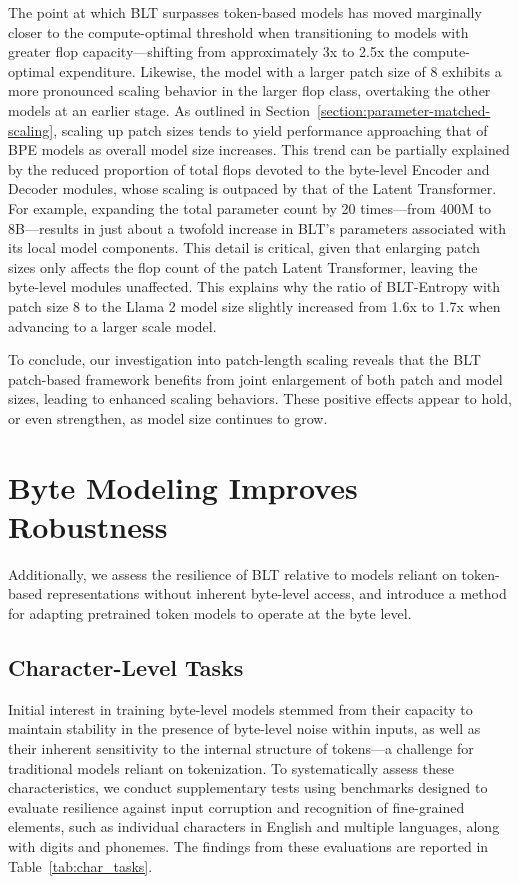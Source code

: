 The point at which {\textsc BLT} surpasses token-based models has moved marginally closer to the compute-optimal threshold when transitioning to models with greater flop capacity—shifting from approximately 3x to 2.5x the compute-optimal expenditure. Likewise, the model with a larger patch size of 8 exhibits a more pronounced scaling behavior in the larger flop class, overtaking the other models at an earlier stage. As outlined in Section~\ref{section:parameter-matched-scaling}, scaling up patch sizes tends to yield performance approaching that of BPE models as overall model size increases. This trend can be partially explained by the reduced proportion of total flops devoted to the byte-level Encoder and Decoder modules, whose scaling is outpaced by that of the Latent Transformer. For example, expanding the total parameter count by 20 times—from 400M to 8B—results in just about a twofold increase in {\textsc BLT}'s parameters associated with its local model components. This detail is critical, given that enlarging patch sizes only affects the flop count of the patch Latent Transformer, leaving the byte-level modules unaffected. This explains why the ratio of {\textsc BLT}-Entropy with patch size 8 to the Llama 2 model size slightly increased from 1.6x to 1.7x when advancing to a larger scale model.

To conclude, our investigation into patch-length scaling reveals that the {\textsc BLT} patch-based framework benefits from joint enlargement of both patch and model sizes, leading to enhanced scaling behaviors. These positive effects appear to hold, or even strengthen, as model size continues to grow.

\section{Byte Modeling Improves Robustness} Additionally, we assess the resilience of {\textsc BLT} relative to models reliant on token-based representations without inherent byte-level access, and introduce a method for adapting pretrained token models to operate at the byte level.
\label{sec:robustness}

\subsection{Character-Level Tasks}

Initial interest in training byte-level models stemmed from their capacity to maintain stability in the presence of byte-level noise within inputs, as well as their inherent sensitivity to the internal structure of tokens—a challenge for traditional models reliant on tokenization. To systematically assess these characteristics, we conduct supplementary tests using benchmarks designed to evaluate resilience against input corruption and recognition of fine-grained elements, such as individual characters in English and multiple languages, along with digits and phonemes. The findings from these evaluations are reported in Table~\ref{tab:char_tasks}.

